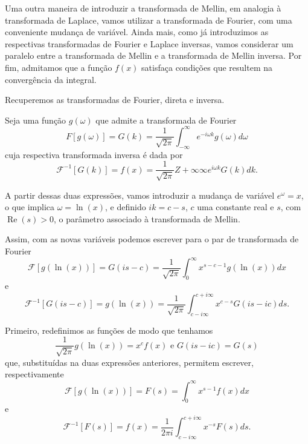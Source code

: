 Uma outra maneira de introduzir a transformada de Mellin, em analogia à transformada de Laplace, vamos utilizar a transformada de Fourier, com uma conveniente mudança de variável. Ainda mais, como já introduzimos as respectivas transformadas de Fourier e Laplace inversas, vamos considerar um paralelo entre a transformada de Mellin e a transformada de Mellin inversa. Por fim, admitamos que a função $f(x)$ satisfaça condições que resultem na convergência da integral.

Recuperemos as transformadas de Fourier, direta e inversa.

Seja uma função $g(\omega)$ que admite a transformada de Fourier
$$F[g(\omega)] = G(k) =
\dfrac{1}{\sqrt{2\pi}}
\int_{-\infty}^{\infty}
e^{-i\omega k} g(\omega) d\omega$$
cuja respectiva transformada inversa é dada por
$$
\mathscr{F}^{-1} [G(k)] = f(x) =
\dfrac{1}{\sqrt{2\pi}}
Z +\infty \infty
e^{i\omega k} G(k) dk.$$

A partir dessas duas expressões, vamos introduzir a mudança de variável $e^\omega = x$, o que implica $\omega = \ln(x)$, e definido
$ik = c-s$, $c$ uma constante real e $s$, com $\operatorname{Re}(s) > 0$, o parâmetro associado à transformada de Mellin.

Assim, com as novas variáveis podemos escrever para o par de transformada de Fourier
$$
\mathscr{F}[g(\ln(x))] =
G(is - c) =
\dfrac{1}{\sqrt{2\pi}}
\int_{0}^{\infty}
x^{s-c-1} g(\ln(x)) dx$$
e
$$
\mathscr{F}^{-1}[G(is-c)] = g(\ln(x)) =
\dfrac{1}{\sqrt{2\pi}} 
\int_{c-i\infty}^{c+i\infty} 
x^{c-s} G(is-ic) ds.$$

Primeiro, redefinimos as funções de modo que tenhamos
$$
\dfrac{1}{\sqrt{2\pi}} 
g(\ln(x)) = x^c f(x) \mbox{ e } G(is - ic) = G(s)$$
que, substituídas na duas expressões anteriores, permitem escrever, respectivamente
$$
\mathscr{F}[g(\ln(x))] = F(s) =
\int_{0}^{\infty}
x^{s-1}f(x) dx$$
e
$$
\mathscr{F}^{-1}[F(s)] = f(x) =
\dfrac{1}{2\pi i}
\int_{c-i\infty}^{c+i\infty} 
x^{-s}F(s) ds.$$




